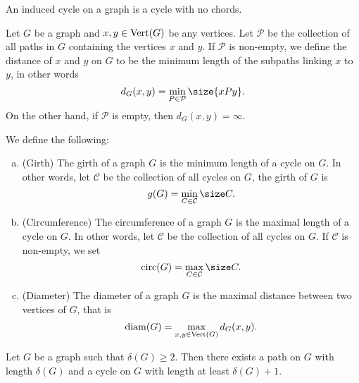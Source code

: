 \begin{definition}\label{def: induced-cycle}
An induced cycle on a graph is a cycle with no chords.
\end{definition}

\begin{definition}[Distance]\label{def: vertex-distance}
Let \(G\) be a graph and \(x, y \in \operatorname{Vert}(G)\) be any vertices. Let \(\mathcal P\)
be the collection of all paths in \(G\) containing the vertices \(x\) and
\(y\). If \(\mathcal P\) is non-empty, we define the distance of \(x\) and
\(y\) on \(G\) to be the minimum length of the subpaths linking \(x\) to
\(y\), in other words
\[
  d_G(x, y) = \min_{P \in \mathcal P} \size{xPy}.
\]
On the other hand, if \(\mathcal P\) is empty, then \(d_G(x, y) = \infty\).
\end{definition}

\begin{definition}
\label{def: miscellaneous-graph-cycle}
We define the following:
\begin{enumerate}[(a).]
  \setlength\itemsep{0.0em}
  \item\label{def: girth}
    (Girth) The girth of a graph \(G\) is the minimum length of a cycle on
    \(G\). In other words, let \(\mathcal C\) be the collection of all cycles
    on \(G\), the girth of \(G\) is
    \[
      g(G) = \min_{C \in \mathcal C} \size C.
    \]
  \item\label{def: circ-graph}
    (Circumference) The circumference of a graph \(G\) is the maximal length
    of a cycle on \(G\). In other words, let \(\mathcal C\) be the collection
    of all cycles on \(G\). If \(\mathcal C\) is non-empty, we set
    \[
      \Circ(G) = \max_{C \in \mathcal C} \size C.
    \]
  \item\label{def: diameter}
    (Diameter) The diameter of a graph \(G\) is the maximal distance between
    two vertices of \(G\), that is
    \[
      \operatorname{diam}(G) = \max_{x, y \in \operatorname{Vert}(G)} d_G(x, y).
    \]
\end{enumerate}
\end{definition}

\begin{proposition}\label{prop: path-cycle-len-delta}
Let \(G\) be a graph such that \(\delta(G) \geq 2\). Then there exists a path
on \(G\) with length \(\delta(G)\) and a cycle on \(G\) with length at least
\(\delta(G) + 1\).
\end{proposition}
